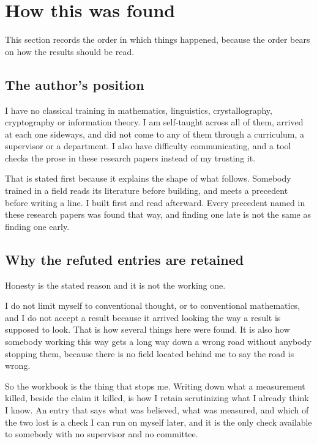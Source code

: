 \chapter*{How this was found}

This section records the order in which things happened, because the order bears on how the results
should be read.

\section*{The author's position}

I have no classical training in mathematics, linguistics, crystallography, cryptography or
information theory. I am self-taught across all of them, arrived at each one sideways, and did not
come to any of them through a curriculum, a supervisor or a department. I also have difficulty
communicating, and a tool checks the prose in these research papers instead of my trusting it.

That is stated first because it explains the shape of what follows. Somebody trained in a field
reads its literature before building, and meets a precedent before writing a line. I built first and
read afterward. Every precedent named in these research papers was found that way, and finding one late is not
the same as finding one early.

\section*{Why the refuted entries are retained}

Honesty is the stated reason and it is not the working one.

I do not limit myself to conventional thought, or to conventional mathematics, and I do not accept a
result because it arrived looking the way a result is supposed to look. That is how several things
here were found. It is also how somebody working this way gets a long way down a wrong road without
anybody stopping them, because there is no field located behind me to say the road is wrong.

So the workbook is the thing that stops me. Writing down what a measurement killed, beside the claim
it killed, is how I retain scrutinizing what I already think I know. An entry that says what was
believed, what was measured, and which of the two lost is a check I can run on myself later, and it
is the only check available to somebody with no supervisor and no committee.

